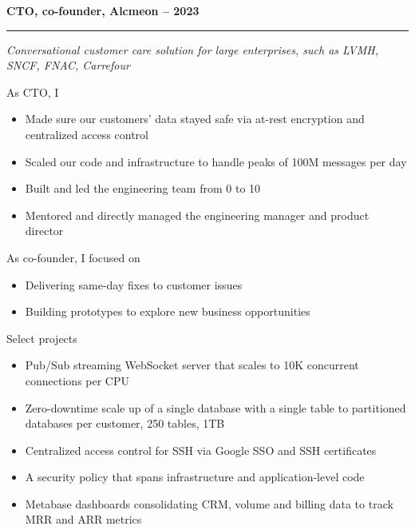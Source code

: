 \documentclass[a4paper,11pt]{article}
\newcommand{\styleRub}[1]{\needspace{6\baselineskip}\noindent\textbf{\large #1}\par\nopagebreak}
\newcommand{\job}[2]{#1\hfill{\normalsize\mdseries #2}}
\newcommand{\company}[1]{\textit{#1}\par\medskip}
\newenvironment{sectionblock}[1]
{\styleRub{#1}\vspace{-0.6\baselineskip}\noindent\rule{\textwidth}{0.5mm}\par\nopagebreak
\begin{list}{}{\setlength{\leftmargin}{10pt}\setlength{\topsep}{0pt}}\item\relax}
{\end{list}}
\begin{document}
\vspace{0.45cm}
\begin{sectionblock}{\job{CTO, co-founder, Alcmeon}{2011 -- 2023}}
\company{Conversational customer care solution for large enterprises, such as LVMH, SNCF, FNAC, Carrefour}

As CTO, I 
\begin{itemize}
\item Made sure our customers' data stayed safe via at-rest encryption
        and centralized access control
\item Scaled our code and infrastructure to handle peaks
      of 100M messages per day
\item Built and led the engineering team from 0 to 10
\item Mentored and directly managed the engineering manager and product
        director
\end{itemize}

As co-founder, I focused on
\begin{itemize}
\item Delivering same-day fixes to customer issues
\item Building prototypes to explore new business opportunities
\end{itemize}

Select projects
\begin{itemize}
\item Pub/Sub streaming WebSocket server that scales to 10K concurrent connections per CPU
\item Zero-downtime scale up of a single database with a single table to partitioned
 databases per customer, 250 tables, 1TB
\item Centralized access control for SSH via Google SSO and SSH certificates
\item A security policy that spans infrastructure and application-level code
\item Metabase dashboards consolidating CRM, volume and billing data 
      to track MRR and ARR metrics
\end{itemize}

\end{sectionblock}
\end{document}
